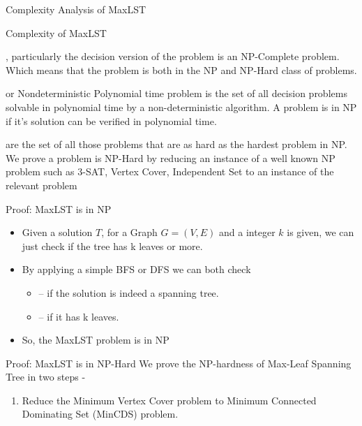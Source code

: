 \documentclass[xcolor=svgnames]{beamer}
\begin{document}
\begin{section}{Complexity Analysis of MaxLST}
    \begin{frame}{Complexity of MaxLST}
        \begin{description}[<+->]
            \item[The MaxLST problem], particularly the decision version of the problem is an NP-Complete problem. Which means that the problem is both in the NP and NP-Hard class of problems.
            \item[NP problems] or Nondeterministic Polynomial time problem is the set of all decision problems solvable in polynomial time by a non-deterministic algorithm. A problem is in NP if it's solution can be verified in polynomial time.
            \item[NP-Hard Problems] are the set of all those problems that are as hard as the hardest problem in NP. We prove a problem is NP-Hard by reducing an instance of a well known NP problem such as 3-SAT, Vertex Cover, Independent Set to an instance of the relevant problem
        \end{description}
    \end{frame}
    \begin{frame}{Proof: MaxLST is in NP}
        \begin{itemize}
            \setlength{\itemsep}{15pt}
            \item Given a solution $T$, for a Graph $G=(V,E)$ and a integer $k$ is given, we can just check if the tree has k leaves or more.
            \item By applying a simple BFS or DFS we can both check
            \begin{itemize}
                \setlength{\itemsep}{3pt}  
                \item[] -- if the solution is indeed a spanning tree.
                \item[] -- if it has k leaves.
            \end{itemize}
            \item So, the MaxLST problem is in NP
        \end{itemize}
    \end{frame}
    \begin{frame}{Proof: MaxLST is in NP-Hard}
        We prove the NP-hardness of Max-Leaf Spanning Tree in two steps -\\
        \begin{enumerate} [<+->]
            \setlength{\itemsep}{5pt}
            \item Reduce the Minimum Vertex Cover problem to Minimum Connected Dominating Set (MinCDS) problem.

\end{enumerate}
\end{frame}
\end{section}
\end{document}

